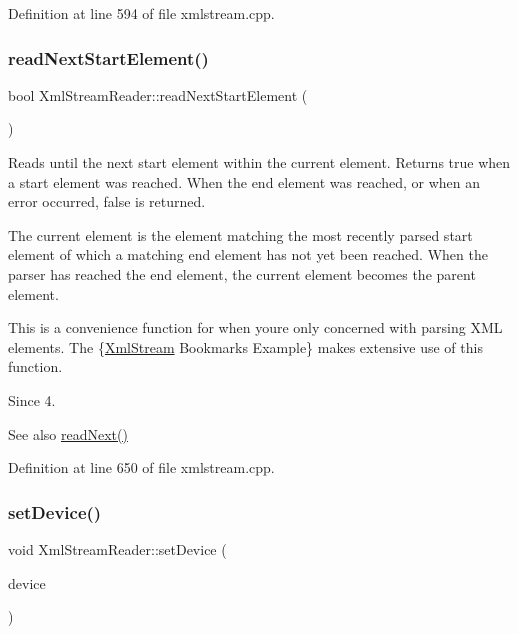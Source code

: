Definition at line 594 of file xmlstream.\+cpp.

\mbox{\label{class_xml_stream_reader_acc156ff248a564ada18939f9382e0b05}} 
\subsubsection{\texorpdfstring{read\+Next\+Start\+Element()}{readNextStartElement()}}
{\footnotesize\ttfamily bool Xml\+Stream\+Reader\+::read\+Next\+Start\+Element (\begin{DoxyParamCaption}{ }\end{DoxyParamCaption})}

Reads until the next start element within the current element. Returns {\ttfamily true} when a start element was reached. When the end element was reached, or when an error occurred, false is returned.

The current element is the element matching the most recently parsed start element of which a matching end element has not yet been reached. When the parser has reached the end element, the current element becomes the parent element.

This is a convenience function for when you\textquotesingle{}re only concerned with parsing X\+ML elements. The \{\hyperlink{class_xml_stream}{Xml\+Stream} Bookmarks Example\} makes extensive use of this function.

\begin{DoxySince}{Since}
4. 
\end{DoxySince}
\begin{DoxySeeAlso}{See also}
\hyperlink{class_xml_stream_reader_adb18e6f9842e9b470cde16385732ad84}{read\+Next()} 
\end{DoxySeeAlso}


Definition at line 650 of file xmlstream.\+cpp.

\mbox{\label{class_xml_stream_reader_a0d166c5c7814d44a0015a82f0500cee5}} 
\subsubsection{\texorpdfstring{set\+Device()}{setDevice()}}
{\footnotesize\ttfamily void Xml\+Stream\+Reader\+::set\+Device (\begin{DoxyParamCaption}\item[{Q\+I\+O\+Device $\ast$}]{device }\end{DoxyParamCaption})}

